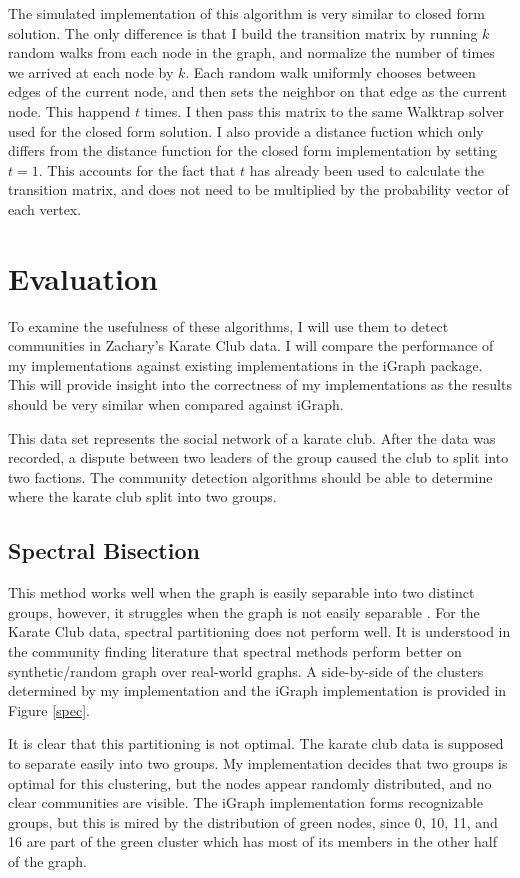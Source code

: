\documentclass{article}
\begin{document}
    The simulated implementation of this algorithm is very similar to closed form solution. The only difference is that I build the transition matrix by running $k$ random walks from each node in the graph, and normalize the number of times we arrived at each node by $k$. Each random walk uniformly chooses between edges of the current node, and then sets the neighbor on that edge as the current node. This happend $t$ times. I then pass this matrix to the same Walktrap solver used for the closed form solution. I also provide a distance fuction which only differs from the distance function for the closed form implementation by setting $t = 1$. This accounts for the fact that $t$ has already been used to calculate the transition matrix, and does not need to be multiplied by the probability vector of each vertex.

\section{Evaluation}
To examine the usefulness of these algorithms, I will use them to detect communities in Zachary's Karate Club data. I will compare the performance of my implementations against existing implementations in the iGraph package. This will provide insight into the correctness of my implementations as the results should be very similar when compared against iGraph.
\par
This data set represents the social network of a karate club. After the data was recorded, a dispute between two leaders of the group caused the club to split into two factions. The community detection algorithms should be able to determine where the karate club split into two groups.

    \subsection{Spectral Bisection}
    This method works well when the graph is easily separable into two distinct groups, however, it struggles when the graph is not easily separable \cite{Newman2004}. For the Karate Club data, spectral partitioning does not perform well. It is understood in the community finding literature that spectral methods perform better on synthetic/random graph over real-world graphs. A side-by-side of the clusters determined by my implementation and the iGraph implementation is provided in Figure \ref{spec}.
    \par
    It is clear that this partitioning is not optimal. The karate club data is supposed to separate easily into two groups. My implementation decides that two groups is optimal for this clustering, but the nodes appear randomly distributed, and no clear communities are visible. The iGraph implementation forms recognizable groups, but this is mired by the distribution of green nodes, since 0, 10, 11, and 16 are part of the green cluster which has most of its members in the other half of the graph.
\end{document}
